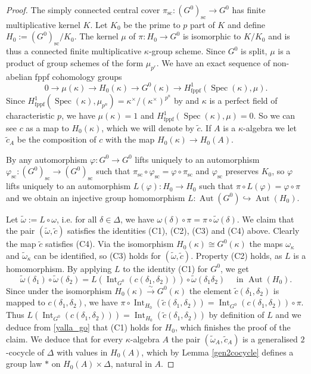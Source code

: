 \documentclass{amsart}
\theoremstyle{definition}
\theoremstyle{remark}
\newcommand{\stackcite}[1]{\cite[\href{https://stacks.math.columbia.edu/tag/#1}{Tag #1}]{stacks-project}}
\DeclareMathOperator{\Aut}{Aut}
\DeclareMathOperator{\Spec}{Spec}
\newcommand{\eqto}{\xrightarrow{\sim}}
\newcommand{\Int}{\operatorname{Int}}
\newcommand{\sic}{\operatorname{sc}}
\begin{document}
\begin{proof}
    The simply connected central cover $\pi_{\sic} : (G^0)_{\sic} \to G^0$ has finite multiplicative kernel $K$.
    Let $K_0$ be the prime to $p$ part of $K$ and define $H_0 := (G^0)_{\sic}/K_0$. The kernel $\mu$ of $\pi : H_0 \to G^0$ is isomorphic to $K/K_0$ and is thus a connected finite multiplicative $\kappa$-group scheme. Since $G^0$ is split, $\mu$ is a product of group schemes of the form $\mu_{p^r}$.
    We have an exact sequence of non-abelian fppf cohomology groups
    $$ 0 \to \mu(\kappa) \to H_0(\kappa) \to G^0(\kappa) \to H^1_{\mathrm{fppf}}(\Spec(\kappa), \mu). $$
    Since $H^1_{\mathrm{fppf}}(\Spec(\kappa), \mu_{p^n}) = \kappa^{\times}/ (\kappa^{\times})^{p^n}$ by \stackcite{040Q} and $\kappa$ is a perfect field 
    of characteristic $p$, we have
    $\mu(\kappa)=1$ and $H^1_{\mathrm{fppf}}(\Spec(\kappa), \mu) = 0$.
    So we can see $c$ as a map to $H_0(\kappa)$, which we will denote by $\tilde c$. If $A$ is 
    a $\kappa$-algebra we let $\tilde{c}_A$ be the composition of $c$ with the map $H_0(\kappa) \to H_0(A)$.

    By \cite[Exercise 6.5.2 (iii)]{bcnrd} any automorphism $\varphi : G^0 \to G^0$ lifts uniquely to an automorphism $\varphi_{\sic} : (G^0)_{\sic} \to (G^0)_{\sic}$ such that 
    $\pi_{\sic} \circ \varphi_{\sic} = \varphi \circ \pi_{\sic}$ 
    and $\varphi_{\sic}$ preserves $K_0$, so $\varphi$ lifts uniquely to an automorphism $L(\varphi) : H_0 \to H_0$ such that $\pi \circ L(\varphi) = \varphi \circ \pi$ and we obtain an injective group homomorphism $L : \Aut(G^0) \hookrightarrow \Aut(H_0)$. 
 


    Let $\tilde \omega := L \circ \omega$, i.e. for all $\delta \in \Delta$, we have $\omega(\delta) \circ \pi = \pi \circ \tilde\omega(\delta)$. We claim that the pair $(\tilde \omega, \tilde c)$ satisfies 
    the identities (C1), (C2), (C3) and (C4) above. 
    Clearly the map $\tilde c$ satisfies  (C4).
    Via the isomorphism $H_0(\kappa) \cong G^0(\kappa)$ the maps $\omega_{\kappa}$ and $\tilde \omega_{\kappa}$ can be identified, so (C3) holds for $(\tilde \omega, \tilde c)$. Property (C2) holds, as $L$ is a homomorphism. By applying $L$ to the identity (C1) for $G^0$, we get
    \begin{equation}\label{yalla_go}
     \tilde \omega(\delta_1) \circ \tilde \omega(\delta_2) = L(\Int_{G^0}(c(\delta_1, \delta_2))) \circ \tilde \omega(\delta_1\delta_2) \quad \text{ in } \Aut(H_0). 
     \end{equation}
    Since under the isomorphism $H_0(\kappa) \eqto G^0(\kappa)$ the element $\tilde c(\delta_1, \delta_2)$ is mapped to $c(\delta_1, \delta_2)$, we have $\pi \circ \Int_{H_0}(\tilde c(\delta_1, \delta_2)) = \Int_{G^0}(c(\delta_1, \delta_2)) \circ \pi$.
    Thus $L(\Int_{G^0}(c(\delta_1, \delta_2))) = \Int_{H_0}(\tilde c(\delta_1, \delta_2))$  by definition of $L$ and we deduce from \eqref{yalla_go} that 
    (C1) holds for $H_0$, which finishes the proof of the claim.
    We deduce that for every $\kappa$-algebra $A$ the pair $(\tilde{\omega}_A, \tilde{c}_A)$ 
    is a  generalised $2$-cocycle of $\Delta$ with values in $H_0(A)$, which by Lemma \ref{gen2cocycle} defines
    a group law $\ast$ on $H_0(A)\times \Delta$, natural in $A$.
   

\end{proof}
\end{document}
